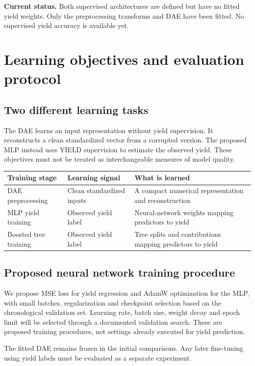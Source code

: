 \documentclass[11pt,a4paper]{article}
\begin{document}
\textbf{Current status.} Both supervised architectures are defined but have no fitted yield weights. Only the preprocessing transforms and DAE have been fitted. No supervised yield accuracy is available yet.

\clearpage\section*{Learning objectives and evaluation protocol}
\subsection*{Two different learning tasks}
The DAE learns an input representation without yield supervision. It reconstructs a clean standardized vector from a corrupted version. The proposed MLP instead uses YIELD supervision to estimate the observed yield. These objectives must not be treated as interchangeable measures of model quality.
\begin{center}
\begin{tabular}{p{.23\linewidth}p{.32\linewidth}p{.34\linewidth}}
\toprule
\textbf{Training stage} & \textbf{Learning signal} & \textbf{What is learned}\\\midrule
DAE preprocessing & Clean standardized inputs & A compact numerical representation and reconstruction\\[4pt]
MLP yield training & Observed yield label & Neural-network weights mapping predictors to yield\\[4pt]
Boosted tree training & Observed yield label & Tree splits and contributions mapping predictors to yield\\
\bottomrule
\end{tabular}
\end{center}
\subsection*{Proposed neural network training procedure}
We propose MSE loss for yield regression and AdamW optimization for the MLP, with small batches, regularization and checkpoint selection based on the chronological validation set. Learning rate, batch size, weight decay and epoch limit will be selected through a documented validation search. These are proposed training procedures, not settings already executed for yield prediction.

The fitted DAE remains frozen in the initial comparisons. Any later fine-tuning using yield labels must be evaluated as a separate experiment.
\end{document}
